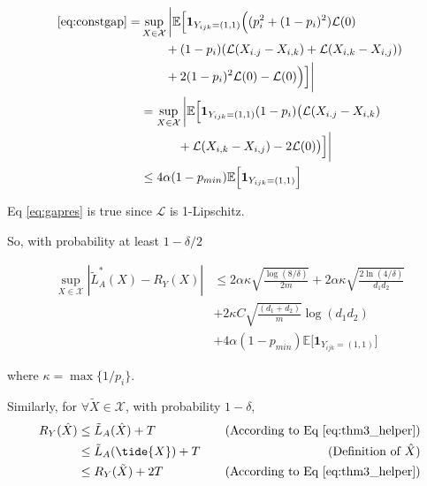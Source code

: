 \documentclass{article}
\numberwithin{equation}{section}
\newcommand{\supX}{\sup_{X \in \mathcal{X}}}
\newcommand{\E}{\mathbb{E}}
\newtheorem{sampling strategy}{Sampling Strategy}
\begin{document}
\begin{subequations}
\begin{align}
    \ref{eq:constgap} = & \supX \bigg| \E\Big[ \bm{1}_{Y_{ijk} = (1,1)} \Big( (p_i^2 + (1-p_i)^2) \mathcal{L}(0) \nonumber \\
    & \qquad + (1-p_i)(\mathcal{L}(X_{i.j} - X_{i,k}) + \mathcal{L}(X_{i,k} - X_{i,j})) \nonumber \\
    & \qquad + 2(1-p_i)^2 \mathcal{L}(0) - \mathcal{L}(0) \Big) \Big] \bigg| \nonumber \\
    & =  \supX \bigg| \E\Big[ \bm{1}_{Y_{ijk} = (1,1)} (1-p_i)\big(\mathcal{L}(X_{i.j} - X_{i,k}) \nonumber \\
    & \qquad \quad + \mathcal{L}(X_{i,k} - X_{i,j}) - 2 \mathcal{L}(0) \big) \Big] \bigg| \nonumber \\
    & \leq 4\alpha(1 - p_{min}) \E\Big[ \bm{1}_{Y_{ijk} = (1,1)} \Big]   \label{eq:gapres}
\end{align}
\end{subequations}

Eq \ref{eq:gapres} is true since $\mathcal{L}$ is 1-Lipschitz.

So, with probability at least $1-\delta/2$

\begin{equation}
    \begin{aligned}
    \sup_{X \in \mathcal{X} } |\tilde{L}_A^*(X) - R_Y(X)| & \leq  2 \alpha \kappa \sqrt{\frac{\log(8/\delta)}{2m}} + 2\alpha \kappa \sqrt{ \frac{2\ln(4/\delta) }{d_1 d_2} } \\
        & + 2 \kappa C \sqrt{\frac{(d_1 + d_2)}{m}} \log(d_1 d_2) \\
        & +   4\alpha(1 - p_{min}) \E\Big[ \bm{1}_{Y_{ijk} = (1,1)} \Big] \label{eq:thm3_helper}
    \end{aligned}
\end{equation}

where $\kappa = \max\{1/p_i\}$.

Similarly,
for $\forall \tilde{X} \in \mathcal{X}$, with probability $1 - \delta$,
\begin{equation}
    \begin{aligned}
        R_Y(\hat{X}) & \leq \tilde{L}_A(\hat{X}) + T &~~~\text{(According to Eq \ref{eq:thm3_helper})} \\
        & \leq \tilde{L}_A(\tide{X}) + T &\text{(Definition of $\hat{X}$)} \\
        & \leq R_Y(\tilde{X}) + 2T  &\text{(According to Eq \ref{eq:thm3_helper})} \nonumber    
    \end{aligned}
\end{equation}
\end{document}
